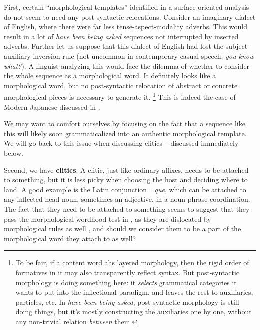 \documentclass[a4paper, oneside, scheme=plain, 12pt]{article}
\newcommand*{\concept}[1]{\textbf{#1}}
\newcommand{\form}[1]{\emph{#1}}
\begin{document}
First, certain ``morphological templates'' identified in a surface-oriented analysis
do not seem to need any post-syntactic relocations.
Consider an imaginary dialect of English,
where there were far less tense-aspect-modality adverbs.
This would result in a lot of \form{have been being asked} sequences
not interrupted by inserted adverbs.
Further let us suppose that this dialect of English had lost the subject-auxiliary inversion rule
(not uncommon in contemporary casual speech: \form{you know what?}).
A linguist analyzing this would face the dilemma of whether to
consider the whole sequence as a morphological word.
It definitely looks like a morphological word,
but no post-syntactic relocation of abstract or concrete morphological pieces is necessary to generate it.%
\footnote{
    To be fair, if a content word ahs layered morphology,
    then the rigid order of formatives in it may also transparently reflect syntax.
    But post-syntactic morphology is doing something here:
    it \emph{selects} grammatical categories it wants to put into the inflectional paradigm,
    and leaves the rest to auxiliaries, particles, etc.
    In \form{have been being asked}, post-syntactic morphology is still doing things,
    but it's mostly constructing the auxiliaries one by one,
    without any non-trivial relation \emph{between} them.
}
This is indeed the case of Modern Japanese discussed in .

We may want to comfort ourselves by focusing on the fact that a sequence like this will likely soon grammaticalized into an authentic morphological template.
We will go back to this issue when discussing clitics -- discussed immediately below.

Second, we have \concept{clitics}.
A clitic, just like ordinary affixes, needs to be attached to something,
but it is less picky when choosing the host and deciding where to land.
A good example is the Latin conjunction \form{=que},
which can be attached to any inflected head noun,
sometimes an adjective, in a noun phrase coordination.
The fact that they need to be attached to something
seems to suggest that they pass the morphological wordhood test in ,
as they are dislocated by morphological rules as well \citep{harley1999distributed},
and should we consider them to be a part of the morphological word they attach to as well?
\end{document}
